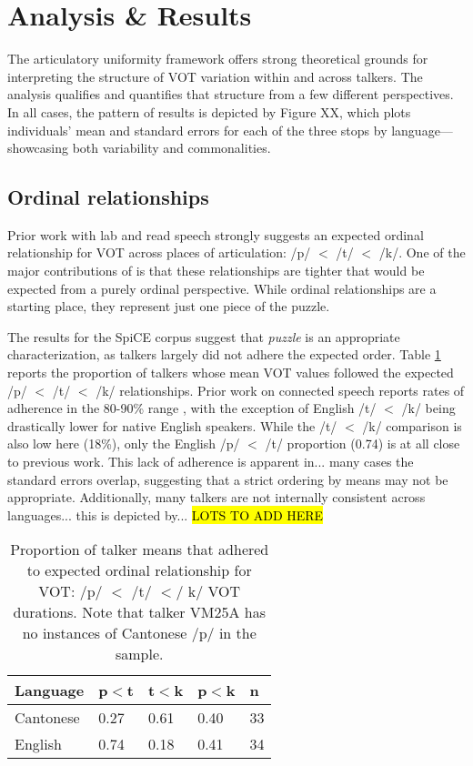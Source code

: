 \section{Analysis \& Results}
The articulatory uniformity framework offers strong theoretical grounds for interpreting the structure of VOT variation within and across talkers. The analysis qualifies and quantifies that structure from a few different perspectives. In all cases, the pattern of results is depicted by Figure XX, which plots individuals' mean and standard errors for each of the three stops by language---showcasing both variability and commonalities.

\subsection{Ordinal relationships}
Prior work with lab and read speech strongly suggests an expected ordinal relationship for VOT across places of articulation: /p/ $<$ /t/ $<$ /k/. One of the major contributions of \citep{chodroff_2017_structure} is that these relationships are tighter that would be expected from a purely ordinal perspective. While ordinal relationships are a starting place, they represent just one piece of the puzzle. 

The results for the SpiCE corpus suggest that \textit{puzzle} is an appropriate characterization, as talkers largely did not adhere the expected order. Table \ref{tab:ordrel} reports the proportion of talkers whose mean VOT values followed the expected /p/ $<$ /t/ $<$ /k/ relationships. Prior work on connected speech reports rates of adherence in the 80-90\% range \citep{chodroff_2019_l2}, with the exception of English /t/ $<$ /k/ being drastically lower for native English speakers. While the /t/ $<$ /k/ comparison is also low here (18\%), only the English /p/ $<$ /t/ proportion (0.74) is at all close to previous work. This lack of adherence is apparent in... many cases the standard errors overlap, suggesting that a strict ordering by means may not be appropriate. Additionally, many talkers are not internally consistent across languages... this is depicted by... \hl{LOTS TO ADD HERE}

\begin{table}[th]
\caption{Proportion of talker means that adhered to expected ordinal relationship for VOT: /p/ $<$ /t/ $<$/ k/ VOT durations. Note that talker VM25A has no instances of Cantonese /p/ in the sample.}
  \label{tab:ordrel}
  \centering
  \begin{tabular}{lllll}
    \toprule
    \textbf{Language} & \textbf{p$<$t} & \textbf{t$<$k} & \textbf{p$<$k} & n \\
    \midrule
    Cantonese	& 0.27	& 0.61	& 0.40	& 33 \\
    English	    & 0.74	& 0.18	& 0.41	& 34 \\
    \bottomrule
  \end{tabular}
\end{table}


